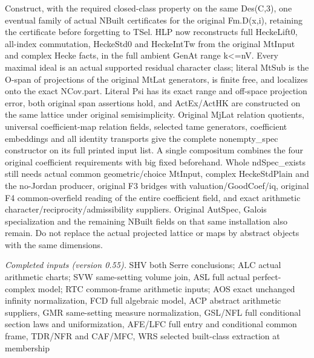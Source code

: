 \documentclass[11pt,a4paper]{article}
\numberwithin{equation}{section}
\theoremstyle{remark}\newtheorem{remark}[theorem]{Remark}
\begin{document}
Construct, with the required closed-class property on the same Des(C,3), one eventual family of actual NBuilt certificates for the original Fm.D(x,i), retaining the certificate before forgetting to TSel. HLP now reconstructs full HeckeLift0, all-index commutation, HeckeStd0 and HeckeIntTw from the original MtInput and complex Hecke facts, in the full ambient GenAt range k<=nV. Every maximal ideal is an actual supported residual character class; literal MtSub is the O-span of projections of the original MtLat generators, is finite free, and localizes onto the exact NCov.part. Literal Psi has its exact range and off-space projection error, both original span assertions hold, and ActEx/ActHK are constructed on the same lattice under original semisimplicity. Original MjLat relation quotients, universal coefficient-map relation fields, selected tame generators, coefficient embeddings and all identity transports give the complete nonempty\_\allowbreak spec constructor on its full printed input list. A single compositum combines the four original coefficient requirements with big fixed beforehand. Whole ndSpec\_\allowbreak exists still needs actual common geometric/choice MtInput, complex HeckeStdPlain and the no-Jordan producer, original F3 bridges with valuation/GoodCoef/iq, original F4 common-overfield reading of the entire coefficient field, and exact arithmetic character/reciprocity/admissibility suppliers. Original AutSpec, Galois specialization and the remaining NBuilt fields on that same installation also remain. Do not replace the actual projected lattice or maps by abstract objects with the same dimensions.

\emph{Completed inputs (version 0.55).} SHV both Serre conclusions; ALC actual arithmetic charts; SVW same-setting volume join, ASL full actual perfect-complex model; RTC common-frame arithmetic inputs; AOS exact unchanged infinity normalization, FCD full algebraic model, ACP abstract arithmetic suppliers, GMR same-setting measure normalization, GSL/NFL full conditional section laws and uniformization, AFE/LFC full entry and conditional common frame, TDR/NFR and CAF/MFC, WRS selected built-class extraction at membership
\end{document}

